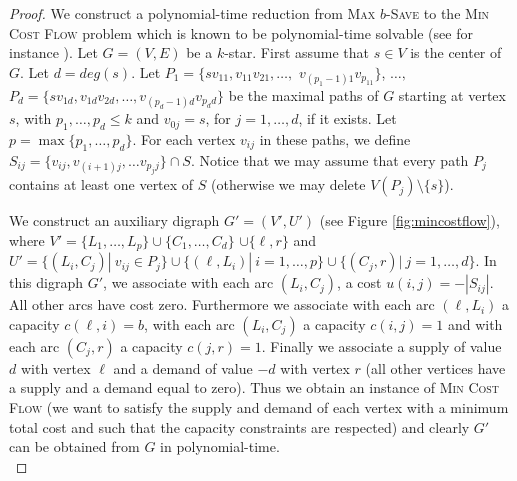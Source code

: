 \documentclass[10pt]{article}
\newcommand{\probtitle}[1]{\textsc{#1}}
\begin{document}
\begin{proof}
We construct a polynomial-time reduction from \probtitle{Max $b$-Save} to the \probtitle{Min Cost Flow} problem which is known to be polynomial-time solvable (see for instance \cite{orlin}).
Let $G=(V,E)$ be a $k$-star. First assume that $s\in V$ is the center of $G$. Let $d=deg(s)$. Let $P_1=\{sv_{11},v_{11}v_{21},\ldots,$ $v_{(p_1-1)1}v_{p_11}\}$, $\ldots,$ $P_{d}=\{sv_{1d},v_{1d}v_{2d},\ldots,v_{(p_d-1)d}v_{p_dd}\}$ be the maximal paths of $G$ starting at vertex $s$, with $p_1,\ldots,p_d\leq k$ and $v_{0j}=s$, for $j=1,\ldots,d$, if it exists. Let $p=\max\{p_1,\ldots,p_d\}$. For each vertex $v_{ij}$ in these paths, we define $S_{ij}=\{v_{ij},v_{(i+1)j},\ldots v_{p_jj}\}\cap S$. Notice that we may assume that every path $P_j$ contains at least one vertex of $S$ (otherwise we may delete $V(P_j)\setminus\{s\}$).

We construct an auxiliary digraph $G'=(V',U')$ (see Figure \ref{fig:mincostflow}), where $V'=\{L_1,\ldots,L_p\}\cup \{C_1,\ldots,C_d\}$ $\cup \{\ell,r\}$ and $U'=\{(L_i,C_j)|\ v_{ij}\in P_j\}\cup \{(\ell,L_i)|\ i=1,\ldots,p\}\cup \{(C_j,r)|\ j=1,\ldots,d\}$. In this digraph $G'$, we associate with each arc $(L_i,C_j)$, a cost $u(i,j)=-|S_{ij}|$. All other arcs have cost zero. Furthermore we associate with each arc $(\ell,L_i)$ a capacity $c(\ell,i)=b$, with each arc $(L_i,C_j)$ a capacity $c(i,j)=1$ and with each arc $(C_j,r)$ a capacity $c(j,r)=1$. Finally we associate a supply of value $d$ with vertex $\ell$ and a demand of value $-d$ with vertex $r$ (all other vertices have a supply and a demand equal to zero). Thus we obtain an instance of \probtitle{Min Cost Flow} (we want to satisfy the supply and demand of each vertex with a minimum total cost and such that the capacity constraints are respected) and clearly $G'$ can be obtained from $G$ in polynomial-time.\\


\end{proof}
\end{document}
